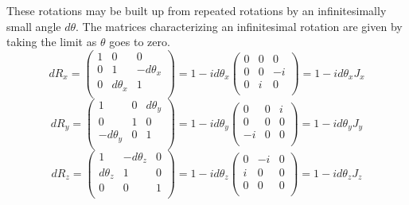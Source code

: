 These rotations may be built up from repeated rotations by an infinitesimally small angle $d\theta$. The matrices characterizing an infinitesimal rotation are given by taking the limit as $\theta$ goes to zero.
\begin{equation}
dR_x = 
\begin{pmatrix}
1 & 0 & 0 \\
0 & 1 & -d\theta_x \\
0 & d\theta_x & 1 \\
\end{pmatrix}
= 1 - id\theta_x
\begin{pmatrix}
0 & 0 & 0 \\
0 & 0 & -i \\
0 & i & 0 \\
\end{pmatrix}
= 1 - id\theta_x J_x
\end{equation}
\begin{equation}
dR_y = 
\begin{pmatrix}
1 & 0 & d\theta_y \\
0 & 1 & 0 \\
-d\theta_y & 0 & 1 \\
\end{pmatrix}
= 1 - id\theta_y
\begin{pmatrix}
0 & 0 & i \\
0 & 0 & 0 \\
-i & 0 & 0 \\
\end{pmatrix}
= 1 - id\theta_y J_y
\end{equation}
\begin{equation}
dR_z = 
\begin{pmatrix}
1 & -d\theta_z & 0 \\
d\theta_z & 1 & 0 \\
0 & 0 & 1 \\
\end{pmatrix}
= 1 - id\theta_z 
\begin{pmatrix}
0 & -i & 0 \\
i & 0 & 0 \\
0 & 0 & 0 \\
\end{pmatrix}
= 1 - id\theta_z J_z
\end{equation}

